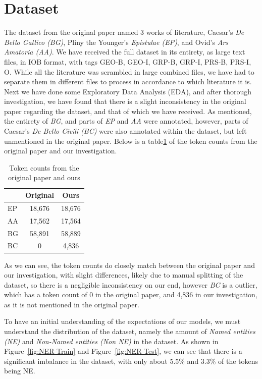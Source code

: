 \documentclass[11pt]{article}
\begin{document}
\section{Dataset}

The dataset from the original paper named 3 works of literature, Caesar's \textit{De Bello Gallico (BG)}, Pliny the Younger's \textit{Epistulae (EP)},
and Ovid's \textit{Ars Amatoria (AA)}. We have received the full dataset in its entirety, as large text files, in IOB format, with tags GEO-B, GEO-I,
GRP-B, GRP-I, PRS-B, PRS-I, O.
While all the literature was scrambled in large combined files, we have had to separate them in different files to process in accordance to which
literature it is. Next we have done some Exploratory Data Analysis (EDA), and after thorough investigation, we have found that there is a slight
inconsistency in the original paper regarding the dataset, and that of which we have received. As mentioned, the entirety of \textit{BG},
and parts of \textit{EP} and \textit{AA} were annotated, however, parts of Caesar's \textit{De Bello Civili (BC)} were also annotated within
the dataset, but left unmentioned in the original paper. Below is a table\ref{tab:token-counts} of the token counts from the original paper
and our investigation.

\begin{table}[H]
  \centering
  \begin{tabular}{|l|c|c|}
  \hline
  \textbf{} & \textbf{Original} & \textbf{Ours} \\
  \hline
  EP   & 18,676 & 18,676 \\
  \hline
  AA   & 17,562 & 17,564 \\
  \hline
  BG   & 58,891 & 58,889 \\
  \hline
  BC   & 0 & 4,836 \\
  \hline
  \end{tabular}
  \caption{Token counts from the original paper and ours}
  \label{tab:token-counts}
\end{table}

As we can see, the token counts do closely match between the original paper and our investigation, with slight differences, likely due to
manual splitting of the dataset, so there is a negligible inconsistency on our end, however \textit{BC} is a outlier, which
has a token count of 0 in the original paper, and 4,836 in our investigation, as it is not mentioned in the original paper.

To have an initial understanding of the expectations of our models, we must understand the distribution of the dataset, namely the amount of
\textit{Named entities (NE)} and \textit{Non-Named entities (Non NE)} in the dataset. As shown in Figure~\ref{fig:NER-Train} and Figure~\ref{fig:NER-Test}, 
we can see that there is a significant imbalance in the dataset, with only about 5.5\% and 3.3\% of the tokens being NE.
\end{document}
